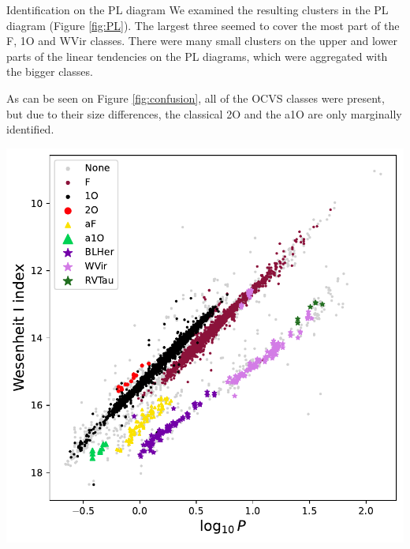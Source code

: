 \documentclass[
    a0paper,
    portrait,
]{baposter}
\begin{document}
\begin{poster}
\begin{posterbox}[name=ident,column=1,below=features,height=bottom]{Identification on the PL diagram}
    We examined the resulting clusters in the PL diagram (Figure \ref{fig:PL}). The largest three seemed to cover the most part of the F, 1O and WVir classes. There were many small clusters on the upper and lower parts of the linear tendencies on the PL diagrams, which were aggregated with the bigger classes. 

    As can be seen on Figure \ref{fig:confusion}, all of the OCVS classes were present, but due to their size differences, the classical 2O and the a1O are only marginally identified.

    \begin{center}
    \includegraphics[width=\textwidth]{fig/PL.pdf}
    \vspace{-5.3mm}
    \label{fig:PL}
    \end{center}


\end{posterbox}
\end{poster}
\end{document}
